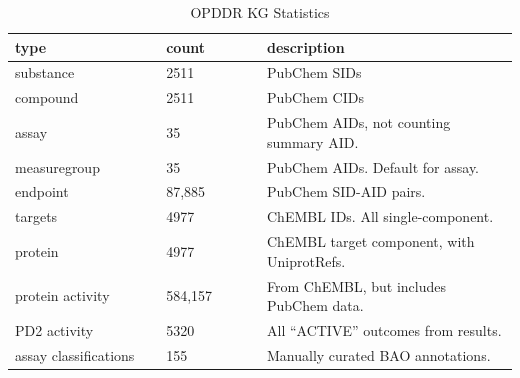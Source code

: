 \begin{table}
\caption{OPDDR KG Statistics}
\label{tab:opddr_03}
\centering
\begin{tabular}{p{0.3\linewidth}p{0.2\linewidth}p{0.5\linewidth}}
\hline
\textbf{type} & \textbf{count} & \textbf{description}\\
\hline
substance & 2511 & PubChem SIDs\\
compound & 2511 & PubChem CIDs\\
assay & 35 & PubChem AIDs, not counting summary AID.\\
measuregroup & 35 & PubChem AIDs.  Default for assay.\\
endpoint & 87,885 & PubChem SID-AID pairs.\\
targets & 4977 & ChEMBL IDs.  All single-component.\\
protein & 4977 & ChEMBL target component, with UniprotRefs.\\
protein activity & 584,157 & From ChEMBL, but includes PubChem data.\\
PD2 activity & 5320 & All “ACTIVE” outcomes from results.\\
assay classifications & 155 & Manually curated BAO annotations.\\
\hline
\end{tabular}
\end{table}

